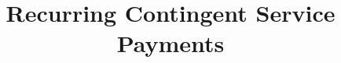 \documentclass[orivec]{llncs}
\begin{document}
  \setlength\abovedisplayskip{0pt}
  \setlength\belowdisplayskip{0pt}


\newenvironment{packed_item}{
\begin{itemize}
	\setlength{\topsep}{0pt}
	\setlength{\partopsep}{0pt}
  \setlength{\itemsep}{0pt}
  \setlength{\parskip}{0pt}
  \setlength{\parsep}{0pt}
}{\end{itemize}}

\newenvironment{packed_enum}{
\begin{enumerate}
	\setlength{\topsep}{0pt}
	\setlength{\partopsep}{0pt}
  \setlength{\itemsep}{0pt}
  \setlength{\parskip}{0pt}
  \setlength{\parsep}{0pt}
}{\end{enumerate}}





\title{Recurring Contingent Service Payments}
%
%
\author{}
\institute{}


\maketitle              %
%
\begin{abstract}




\end{abstract}
 



%
%
%



\appendix

%
\end{document}
